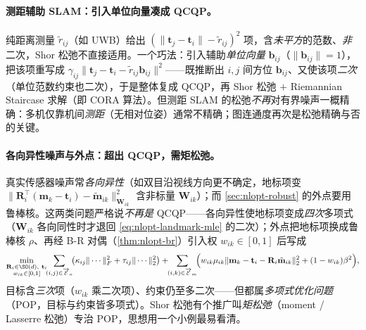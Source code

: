 \paragraph{测距辅助 SLAM：引入单位向量凑成 QCQP。}\cite{carlone2026handbook}
纯距离测量 $\tilde{r}_{ij}$（如 UWB）给出 $(\|\mathbf{t}_j-\mathbf{t}_i\|-\tilde{r}_{ij})^2$ 项，含\emph{未平方}的范数、\emph{非}二次，Shor 松弛不直接适用。一个巧法：引入辅助\emph{单位向量} $\mathbf{b}_{ij}$（$\|\mathbf{b}_{ij}\|=1$），把该项重写成 $\gamma_{ij}\|\mathbf{t}_j-\mathbf{t}_i-\tilde{r}_{ij}\mathbf{b}_{ij}\|^2$——既推断出 $i,j$ 间方位 $\mathbf{b}_{ij}$、又使该项\emph{二次}（单位范数约束也二次），于是整体复成 QCQP，再 Shor 松弛 $+$ Riemannian Staircase 求解（即 CORA 算法）。但测距 SLAM 的松弛\emph{不再}对有界噪声一概精确：多机仅靠机间\emph{测距}（无相对位姿）通常不精确；图连通度再次是松弛精确与否的关键。

\paragraph{各向异性噪声与外点：超出 QCQP，需矩松弛。}\cite{carlone2026handbook,yang2021teaser}
真实传感器噪声常\emph{各向异性}（如双目沿视线方向更不确定，地标项变 $\|\mathbf{R}_i^\top(\mathbf{m}_k-\mathbf{t}_i)-\tilde{\mathbf{m}}_{ik}\|_{\mathbf{W}_{ik}}^2$ 含非标量 $\mathbf{W}_{ik}$）；而 \cref{sec:nlopt-robust} 的外点要用鲁棒核。这两类问题严格说\emph{不再是} QCQP——各向异性使地标项变成\emph{四次}多项式（$\mathbf{W}_{ik}$ 各向同性时才退回 \cref{eq:nlopt-landmark-mle} 的二次）；外点把地标项换成鲁棒核 $\rho$、再经 B-R 对偶（\cref{thm:nlopt-br}）引入权 $w_{ik}\in[0,1]$ 后写成
\begin{equation}
  \min_{\substack{\mathbf{R}_i\in\SO(d),\ \mathbf{t}_i\\ w_{ik}\in[0,1]}}
  \!\!\sum_{(i,j)\in\overrightarrow{\mathcal{E}}_o}\!\!\big(\kappa_{ij}\|\cdots\|_F^2+\tau_{ij}\|\cdots\|_2^2\big)
  +\!\!\sum_{(i,k)\in\overrightarrow{\mathcal{E}}_m}\!\!\Big(w_{ik}\mu_{ik}\|\mathbf{m}_k-\mathbf{t}_i-\mathbf{R}_i\tilde{\mathbf{m}}_{ik}\|_2^2+(1-w_{ik})\beta^2\Big),
  \label{eq:nlopt-outlier-br}
\end{equation}
目标含\emph{三次}项（$w_{ik}$ 乘二次项）、约束仍至多二次——但都属\emph{多项式优化问题}（POP，目标与约束皆多项式）。Shor 松弛有个推广叫\emph{矩松弛}（moment / Lasserre 松弛）专治 POP，思想用一个小例最易看清。

